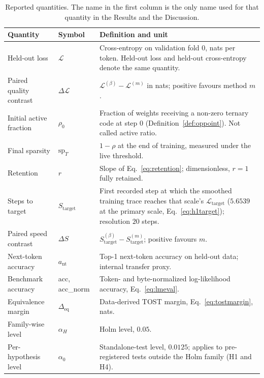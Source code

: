 \documentclass[final,5p,times,twocolumn]{elsarticle}
\theoremstyle{remark}
\newcommand{\rhoz}{\rho_{0}}
\newcommand{\dL}{\Delta\mathcal{L}}
\newcommand{\dS}{\Delta S}
\begin{document}
\begin{table}[t]
\centering
\small
\caption{Reported quantities. The name in the first column is the only name
used for that quantity in the Results and the Discussion.}
\label{tab:metrics}
\begin{tabular}{@{}llp{6.0cm}@{}}
\toprule
Quantity & Symbol & Definition and unit \\
\midrule
Held-out loss & $\mathcal{L}$ &
Cross-entropy on validation fold $0$, nats per token. Held-out loss and
held-out cross-entropy denote the same quantity. \\
\addlinespace
Paired quality contrast & $\dL$ &
$\mathcal{L}^{(\beta)}-\mathcal{L}^{(m)}$ in nats; positive favours method $m$. \\
\addlinespace
Initial active fraction & $\rhoz$ &
Fraction of weights receiving a non-zero ternary code at step $0$
(Definition~\ref{def:oppoint}). Not called active ratio. \\
\addlinespace
Final sparsity & $\mathrm{sp}_{T}$ &
$1-\rho$ at the end of training, measured under the live threshold. \\
\addlinespace
Retention & $r$ &
Slope of Eq.~\eqref{eq:retention}; dimensionless, $r=1$ fully retained. \\
\addlinespace
Steps to target & $S_{\mathrm{target}}$ &
First recorded step at which the smoothed training trace reaches that
scale's $\mathcal{L}_{\mathrm{target}}$ ($5.6539$ at the primary scale,
Eq.~\eqref{eq:h1target}); resolution $20$ steps. \\
\addlinespace
Paired speed contrast & $\dS$ &
$S^{(\beta)}_{\mathrm{target}}-S^{(m)}_{\mathrm{target}}$; positive favours $m$. \\
\addlinespace
Next-token accuracy & $a_{\mathrm{nt}}$ &
Top-1 next-token accuracy on held-out data; internal transfer proxy. \\
\addlinespace
Benchmark accuracy & acc, acc\_norm &
Token- and byte-normalized log-likelihood accuracy, Eq.~\eqref{eq:lmeval}. \\
\addlinespace
Equivalence margin & $\Delta_{\mathrm{eq}}$ &
Data-derived TOST margin, Eq.~\eqref{eq:tostmargin}, nats. \\
\addlinespace
Family-wise level & $\alpha_{H}$ & Holm level, $0.05$. \\
Per-hypothesis level & $\alpha_{0}$ & Standalone-test level, $0.0125$;
applies to pre-registered tests outside the Holm family (H1 and H4). \\
\bottomrule
\end{tabular}
\end{table}
\end{document}
